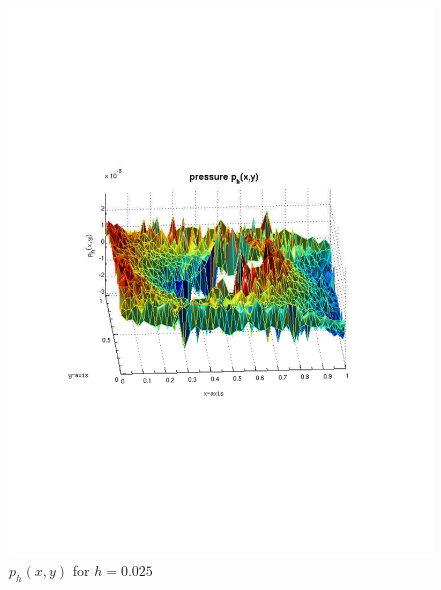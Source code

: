 \documentclass[12pt]{article}
\begin{document}
                \begin{figure}[htb]
                    \begin{center}
                \includegraphics[scale=0.50]{./../files/box-circle/p.pdf}
                \caption{$p_h(x,y)$ for $h = 0.025$}
            \end{center}
            \end{figure}
\end{document}
